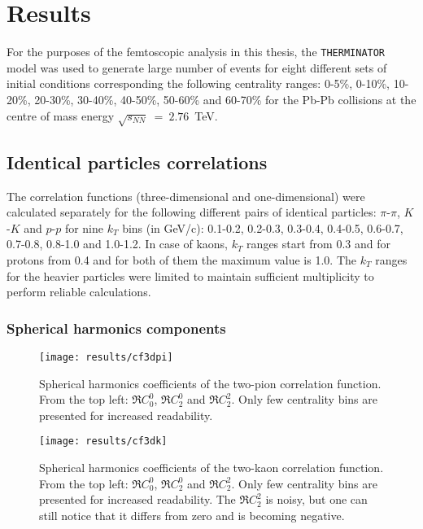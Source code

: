 \chapter{Results}
  For the purposes of the femtoscopic analysis in this thesis, the \verb|THERMINATOR| model was used to generate large number of events for eight different sets of initial conditions corresponding the following centrality ranges: 0-5\%, 0-10\%, 10-20\%, 20-30\%, 30-40\%, 40-50\%, 50-60\% and 60-70\% for the Pb-Pb collisions at the centre of mass energy $\sqrt{s_{NN}}~=~2.76$~TeV.
  \section{Identical particles correlations}
    The correlation functions (three-dimensional and one-dimensional) were calculated separately for the following different pairs of identical particles: $\pi$-$\pi$, $K$-$K$ and  $p$-$p$ for nine $k_T$ bins (in GeV/c): 0.1-0.2, 0.2-0.3, 0.3-0.4, 0.4-0.5, 0.6-0.7, 0.7-0.8, 0.8-1.0 and 1.0-1.2.
    In case of kaons, $k_T$ ranges start from 0.3 and for protons from 0.4 and for both of them the maximum value is 1.0.
    The $k_T$ ranges for the heavier particles were limited to maintain sufficient multiplicity to perform reliable calculations.
    \subsection{Spherical harmonics components}

      \begin{figure}[b]
        \centering
        \centerline{\texttt{[image: results/cf3dpi]}}
        \caption{Spherical harmonics coefficients of the two-pion correlation function. From the top left: $\Re C^0_0$, $\Re C^0_2$ and $\Re C^2_2$. Only few centrality bins are presented for increased readability.}
      \label{fig:cf3dpi}
      \end{figure}

      \begin{figure}[b]
        \centering
        \centerline{\texttt{[image: results/cf3dk]}}
        \caption{Spherical harmonics coefficients of the two-kaon correlation function. From the top left: $\Re C^0_0$, $\Re C^0_2$ and $\Re C^2_2$. Only few centrality bins are presented for increased readability. The $\Re C^2_2$ is noisy, but one can still notice that it differs from zero and is becoming negative.}
      \label{fig:cf3dk}
      \end{figure} 

